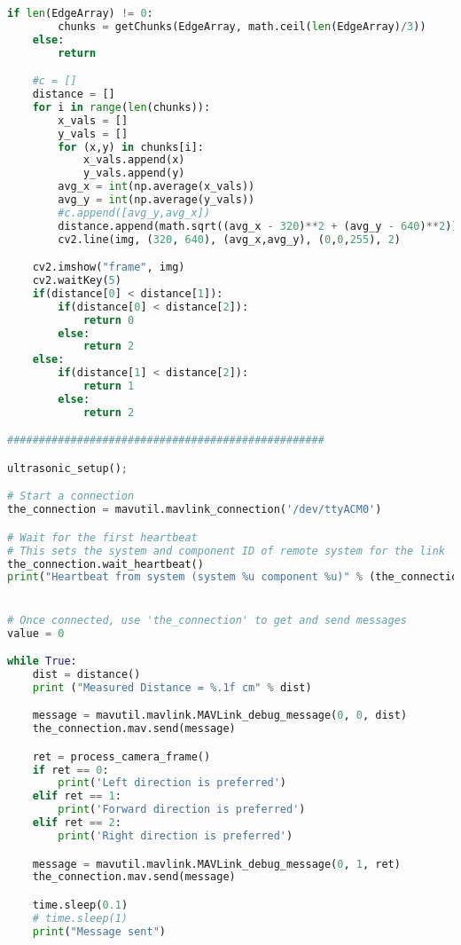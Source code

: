 \begin{lstlisting}[language=python,caption=Part 2 Python Code, label=list:part2_py]
    if len(EdgeArray) != 0:
        chunks = getChunks(EdgeArray, math.ceil(len(EdgeArray)/3))
    else:
        return

    #c = []
    distance = []
    for i in range(len(chunks)):
        x_vals = []
        y_vals = []
        for (x,y) in chunks[i]:
            x_vals.append(x)
            y_vals.append(y)
        avg_x = int(np.average(x_vals))
        avg_y = int(np.average(y_vals))
        #c.append([avg_y,avg_x])
        distance.append(math.sqrt((avg_x - 320)**2 + (avg_y - 640)**2))
        cv2.line(img, (320, 640), (avg_x,avg_y), (0,0,255), 2)

    cv2.imshow("frame", img)
    cv2.waitKey(5)
    if(distance[0] < distance[1]):
        if(distance[0] < distance[2]):
            return 0
        else:
            return 2
    else:
        if(distance[1] < distance[2]):
            return 1
        else:
            return 2

##################################################

ultrasonic_setup();

# Start a connection
the_connection = mavutil.mavlink_connection('/dev/ttyACM0')

# Wait for the first heartbeat
# This sets the system and component ID of remote system for the link
the_connection.wait_heartbeat()
print("Heartbeat from system (system %u component %u)" % (the_connection.target_system, the_connection.target_component))


# Once connected, use 'the_connection' to get and send messages
value = 0

while True:
    dist = distance()
    print ("Measured Distance = %.1f cm" % dist)

    message = mavutil.mavlink.MAVLink_debug_message(0, 0, dist)
    the_connection.mav.send(message)

    ret = process_camera_frame()
    if ret == 0:
        print('Left direction is preferred')
    elif ret == 1:
        print('Forward direction is preferred')
    elif ret == 2:
        print('Right direction is preferred')

    message = mavutil.mavlink.MAVLink_debug_message(0, 1, ret)
    the_connection.mav.send(message)

    time.sleep(0.1)
    # time.sleep(1)
    print("Message sent")
\end{lstlisting}
